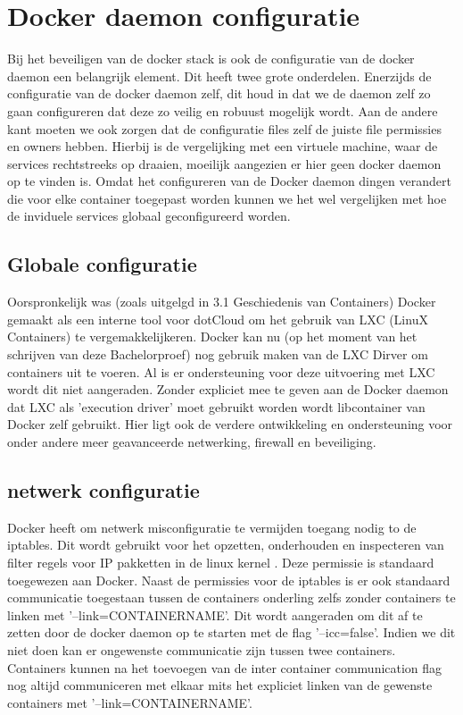 \section{Docker daemon configuratie}

Bij het beveiligen van de docker stack is ook de configuratie van de docker daemon een belangrijk element. Dit heeft twee grote onderdelen. Enerzijds de configuratie van de docker daemon zelf, dit houd in dat we de daemon zelf zo gaan configureren dat deze zo veilig en robuust mogelijk wordt. Aan de andere kant moeten we ook zorgen dat de configuratie files zelf de juiste file permissies en owners hebben. Hierbij is de vergelijking met een virtuele machine, waar de services rechtstreeks op draaien, moeilijk aangezien er hier geen docker daemon op te vinden is. Omdat het configureren van de Docker daemon dingen verandert die voor elke container toegepast worden kunnen we het wel vergelijken met hoe de inviduele services globaal geconfigureerd worden.


\subsection{Globale configuratie}


Oorspronkelijk was (zoals uitgelgd in 3.1 Geschiedenis van Containers) Docker gemaakt als een interne tool voor dotCloud om het gebruik van LXC (LinuX Containers) te vergemakkelijkeren. Docker kan nu (op het moment van het schrijven van deze Bachelorproef) nog gebruik maken van de LXC Dirver om containers uit te voeren. Al is er ondersteuning voor deze uitvoering met LXC wordt dit niet aangeraden. Zonder expliciet mee te geven aan de Docker daemon dat LXC als 'execution driver' moet gebruikt worden wordt libcontainer van Docker zelf gebruikt. Hier ligt ook de verdere ontwikkeling en ondersteuning voor onder andere meer geavanceerde netwerking, firewall en beveiliging.

\subsection{netwerk configuratie}

Docker heeft om netwerk misconfiguratie te vermijden toegang nodig to de iptables. Dit wordt gebruikt voor het opzetten, onderhouden en inspecteren van filter regels voor IP pakketten in de linux kernel \cite{Eychenne2016}. Deze permissie is standaard toegewezen aan Docker. Naast de permissies voor de iptables is er ook standaard communicatie toegestaan tussen de containers onderling zelfs zonder containers te linken met '--link=CONTAINERNAME'. Dit wordt aangeraden om dit af te zetten door de docker daemon op te starten met de flag '--icc=false'. Indien we dit niet doen kan er ongewenste communicatie zijn tussen twee containers. Containers kunnen na het toevoegen van de inter container communication flag nog altijd communiceren met elkaar mits het expliciet linken van de gewenste containers met '--link=CONTAINERNAME'. 

